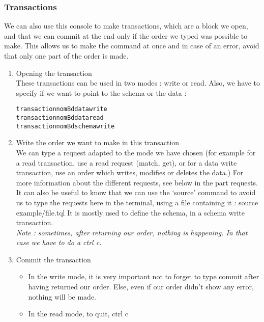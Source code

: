 \documentclass[runningheads]{llncs}
\begin{document}
  \subsubsection{Transactions}
We can also use this console to make transactions, which are a block we open, and that we can commit at the end only if the order we typed was possible to make. This allows us to make the command at once and in case of an error, avoid that only one part of the order is made.

\begin{enumerate}
\item Opening  the transaction\\
These transactions can be used in two modes : write or read. Also, we have to specify if we want to point to the schema or the data :

\begin{alltt}
transaction nomBd data write
transaction nomBd data read
transaction nomBd schema write
\end{alltt}       

\item Write the order we want to make in this transaction\\
We can type a request adapted to the mode we have chosen (for example for a read transaction, use a read request (match, get), or for a data write transaction, use an order which writes, modifies or deletes the data.) For more information about the different requests, see below in the part requests.\\

It can also be useful to know that we can use the ‘source’ command to avoid us to type the requests here in the terminal, using a file containing it : 
        source example/file.tql
It is mostly used to define the schema, in a schema write transaction.\\

\emph{Note : sometimes, after returning our order, nothing is happening. In that case we have to do a ctrl c.}\\

\item Commit the transaction
\begin{itemize}
\item In the write mode, it is very important not to forget to type commit after having returned our order. Else, even if our order didn’t show any error, nothing will be made.
\item In the read mode, to quit, ctrl c
\end{itemize}

\end{enumerate}
\end{document}

